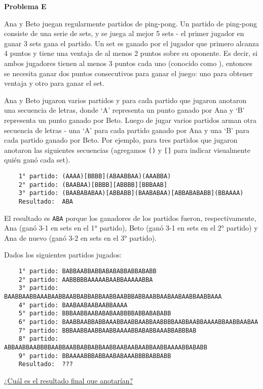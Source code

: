 \begin{center}
\Large \textbf{Problema E} \\
\end{center}

Ana y Beto juegan regularmente partidos de ping-pong.
Un partido de ping-pong consiste de una serie de sets, y se juega al mejor 5 sets - el primer jugador en ganar 3 sets gana el partido.
Un set es ganado por el jugador que primero alcanza 4 puntos y tiene una ventaja de al menos 2 puntos sobre su oponente.
Es decir, si ambos jugadores tienen al menos 3 puntos cada uno (conocido como ), entonces se necesita ganar dos puntos consecutivos para ganar el juego:
uno para obtener ventaja y otro para ganar el set.

\bigskip
Ana y Beto jugaron varios partidos y para cada partido que jugaron anotaron una secuencia de letras, donde \lq A' representa un punto ganado por Ana y \lq B'
representa un punto ganado por Beto. Luego de jugar varios partidos arman otra secuencia de letras - una \lq A' para cada partido ganado por Ana y una \lq B' para
cada partido ganado por Beto. Por ejemplo, para tres partidos que jugaron anotaron las siguientes secuencias (agregamos \texttt{()} y \texttt{[]} para indicar
visualmente quién ganó cada set).

\begin{verbatim}
    1° partido: (AAAA)[BBBB](ABAABBAA)(AAABBA)
    2° partido: (BAABAA)[BBBB][ABBBB][BBBAAB]
    3° partido: (BAABABABAA)[ABBABB](BAABABAA)[ABBABABABB](BBAAAA)
    Resultado:  ABA
\end{verbatim}

El resultado es \texttt{ABA} porque los ganadores de los partidos fueron, respectivamente, Ana (ganó 3-1 en sets en el 1° partido),
Beto (ganó 3-1 en sets en el 2° partido) y Ana de nuevo (ganó 3-2 en sets en el 3° partido).

\bigskip

Dados los siguientes partidos jugados:
\begin{verbatim}
    1° partido: BABBAABBABBABABABBABBABABB
    2° partido: AABBBBBAAAAABAABBAAAAABBA
    3° partido: BAABBAABBAAABAABBAABBABBABBAABBAABBBABBAABBAABAABAABBAABBAAA
    4° partido: BAABAABAABAABBAAAA
    5° partido: BBBAABBAABABABAABBBBABBABABABB
    6° partido: BAABBAABBABBAAABBAABBAABBAABBBBAABBAABBAAAABBAABBAABAA
    7° partido: BBBAABBAABBAABBAAAABBABABBAAABBABBBAB
    8° partido: ABBAABBAABBBBAABBAABBABBABBAABBAABAABAABBAABBAAAABBABABB
    9° partido: BBAAAABBBABBAABABAAABBBBABBABB
    Resultado:  ???
\end{verbatim}

\underline{¿Cuál es el resultado final que anotarían?}




